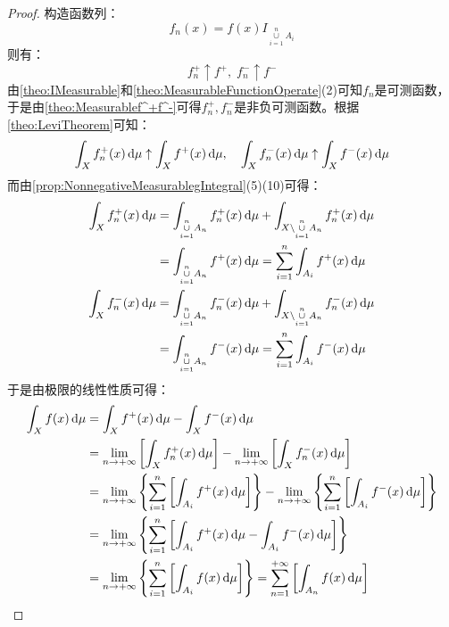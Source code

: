 \begin{proof}
	构造函数列：
	\begin{equation*}
		f_n(x)=f(x)I_{\underset{i=1}{\overset{n}{\cup}}A_i}
	\end{equation*}
	则有：
	\begin{equation*}
		f_n^+\uparrow f^+,\;f_n^-\uparrow f^-
	\end{equation*}
	由\cref{theo:IMeasurable}和\cref{theo:MeasurableFunctionOperate}(2)可知$f_n$是可测函数，于是由\cref{theo:Measurablef^+f^-}可得$f_n^+,f_n^-$是非负可测函数。根据\cref{theo:LeviTheorem}可知：
	\begin{equation*}
		\int_{X}f_n^+(x)\mathop{}\!\mathrm{d}\mu\uparrow\int_{X}f^+(x)\mathop{}\!\mathrm{d}\mu,\quad\int_{X}f_n^-(x)\mathop{}\!\mathrm{d}\mu\uparrow\int_{X}f^-(x)\mathop{}\!\mathrm{d}\mu
	\end{equation*}
	而由\cref{prop:NonnegativeMeasurablegIntegral}(5)(10)可得：
	\begin{gather*}
		\begin{aligned}
			\int_{X}f_n^+(x)\dif\mu
			&=\int_{\underset{i=1}{\overset{n}{\cup}}A_n}f_n^+(x)\dif\mu+\int_{X\backslash\underset{i=1}{\overset{n}{\cup}}A_n}f_n^+(x)\dif\mu \\
			&=\int_{\underset{i=1}{\overset{n}{\cup}}A_n}f^+(x)\dif\mu
			=\sum_{i=1}^{n}\int_{A_i}f^+(x)\dif\mu
		\end{aligned} \\
		\begin{aligned}
			\int_{X}f_n^-(x)\dif\mu
			&=\int_{\underset{i=1}{\overset{n}{\cup}}A_n}f_n^-(x)\dif\mu+\int_{X\backslash\underset{i=1}{\overset{n}{\cup}}A_n}f_n^-(x)\dif\mu \\
			&=\int_{\underset{i=1}{\overset{n}{\cup}}A_n}f^-(x)\dif\mu
			=\sum_{i=1}^{n}\int_{A_i}f^-(x)\dif\mu
		\end{aligned} 
	\end{gather*}
	于是由极限的线性性质可得：
	\begin{align*}
		\int_{X}f(x)\dif\mu&=\int_{X}f^+(x)\dif\mu-\int_{X}f^-(x)\dif\mu \\
		&=\lim_{n\to+\infty}\left[\int_{X}f_n^+(x)\dif\mu\right]-\lim_{n\to+\infty}\left[\int_{X}f_n^-(x)\dif\mu\right] \\
		&=\lim_{n\to+\infty}\left\{\sum_{i=1}^{n}\left[\int_{A_i}f^+(x)\dif\mu\right]\right\}-\lim_{n\to+\infty}\left\{\sum_{i=1}^{n}\left[\int_{A_i}f^-(x)\dif\mu\right]\right\} \\
		&=\lim_{n\to+\infty}\left\{\sum_{i=1}^{n}\left[\int_{A_i}f^+(x)\dif\mu-\int_{A_i}f^-(x)\dif\mu\right]\right\} \\
		&=\lim_{n\to+\infty}\left\{\sum_{i=1}^{n}\left[\int_{A_i}f(x)\dif\mu\right]\right\}=\sum_{n=1}^{+\infty}\left[\int_{A_n}f(x)\dif\mu\right]\qedhere
	\end{align*}
\end{proof}
